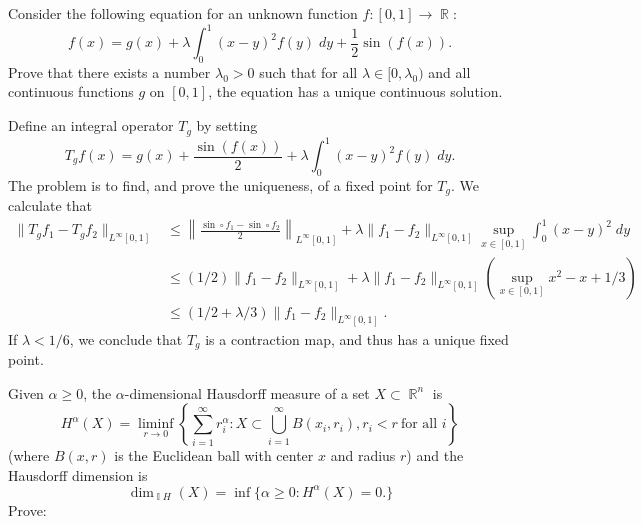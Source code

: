 \documentclass[answers]{exam}
\DeclareMathOperator{\RR}{\mathbb{R}}
\DeclareMathOperator{\II}{\mathbb{I}}
\begin{document}
\begin{questions}

\question Consider the following equation for an unknown function $f: [0,1] \to \RR$:
%
\[ f(x) = g(x) + \lambda \int_0^1 (x - y)^2 f(y)\; dy + \frac{1}{2} \sin(f(x)). \]
%
Prove that there exists a number $\lambda_0 > 0$ such that for all $\lambda \in [0,\lambda_0)$ and all continuous functions $g$ on $[0,1]$, the equation has a unique continuous solution.
\begin{solution}
	Define an integral operator $T_g$ by setting
	\[ T_g f(x) = g(x) + \frac{\sin(f(x))}{2} + \lambda \int_0^1 (x - y)^2 f(y)\; dy. \]
	The problem is to find, and prove the uniqueness, of a fixed point for $T_g$. We calculate that
	\begin{align*}
		\| T_g f_1 - T_g f_2 \|_{L^\infty[0,1]} &\leq \left\| \frac{\sin \circ f_1 - \sin \circ f_2}{2} \right\|_{L^\infty[0,1]} + \lambda \| f_1 - f_2 \|_{L^\infty[0,1]} \sup_{x \in [0,1]} \int_0^1 (x - y)^2\; dy\\
		&\leq (1/2) \| f_1 - f_2 \|_{L^\infty[0,1]} + \lambda \| f_1 - f_2 \|_{L^\infty[0,1]} \left( \sup_{x \in [0,1]} x^2 - x + 1/3 \right)\\
		&\leq (1/2 + \lambda / 3) \| f_1 - f_2 \|_{L^\infty[0,1]}.
	\end{align*}
	If $\lambda < 1/6$, we conclude that $T_g$ is a contraction map, and thus has a unique fixed point.
\end{solution}

\question Given $\alpha \geq 0$, the $\alpha$-dimensional Hausdorff measure of a set $X \subset \RR^n$ is
%
\[ H^\alpha(X) = \liminf_{r \to 0} \left\{ \sum_{i = 1}^\infty r_i^\alpha : X \subset \bigcup_{i = 1}^\infty B(x_i,r_i), r_i < r\ \text{for all $i$} \right\} \]
%
(where $B(x,r)$ is the Euclidean ball with center $x$ and radius $r$) and the Hausdorff dimension is
%
\[ \dim_{\II{H}}(X) = \inf \{ \alpha \geq 0: H^\alpha(X) = 0. \} \]
%
Prove:
%
\begin{parts}

\end{parts}
\end{questions}
\end{document}
